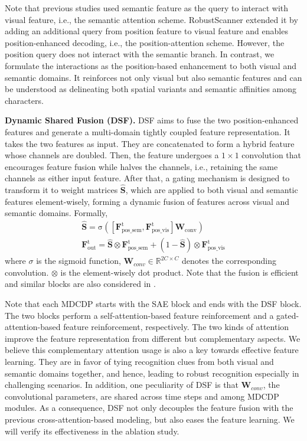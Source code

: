 Note that previous studies \citep{Baekwhats_wrong_19ICCV,li2019sar} used semantic feature as the query to interact with visual feature, i.e., the semantic attention scheme. RobustScanner \citep{yue2020robustscanner} extended it by adding an additional query from position feature to visual feature and enables position-enhanced decoding, i.e., the position-attention scheme. However, the position query does not interact with the semantic branch. In contrast, we formulate the interactions as the position-based enhancement to both visual and semantic domains. It reinforces not only visual but also semantic features and can be understood as delineating both spatial variants and semantic affinities among characters.

\noindent\textbf{Dynamic Shared Fusion (DSF).}
DSF aims to fuse the two position-enhanced features and generate a multi-domain tightly coupled feature representation. It takes the two features as input. They are concatenated to form a hybrid feature whose channels are doubled. Then, the feature undergoes a $1\times1$ convolution that encourages feature fusion while halves the channels, i.e., retaining the same channels as either input feature. After that, a gating mechanism is designed to transform it to weight matrices $\hat{\textbf{S}}$, which are applied to both visual and semantic features element-wisely, forming a dynamic fusion of features across visual and semantic domains. Formally,
\begin{gather}
\mathrm{\hat{\textbf{S}} = \sigma([\textbf{F}^t_{pos\_sem}, \textbf{F}^t_{pos\_vis}]\textbf{W}_{conv})}
\\
\mathrm{\textbf{F}^t_{out} =   \hat{\textbf{S}}\otimes \textbf{F}^t_{pos\_sem}+(1-\hat{\textbf{S}})\otimes \textbf{F}^t_{pos\_vis}}
\label{eq_sf}
\end{gather}
where $\sigma$ is the sigmoid function, $\textbf{W}_{conv}\in\mathbb{R}^{2C\times C}$ denotes the corresponding convolution. $\otimes$ is the element-wisely dot product. Note that the fusion is efficient and similar blocks are also considered in \citep{ABInet21CVPR,SRNyu2020towards}.


Note that each MDCDP starts with the SAE block and ends with the DSF block. The two blocks perform a self-attention-based feature reinforcement and a gated-attention-based feature reinforcement, respectively. The two kinds of attention improve the feature representation from different but complementary aspects. We believe this complementary attention usage is also a key towards effective feature learning. They are in favor of tying recognition clues from both visual and semantic domains together, and hence, leading to robust recognition especially in challenging scenarios. In addition, one peculiarity of DSF is that $\textbf{W}_{conv}$, the convolutional parameters, are shared across time steps and among MDCDP modules. As a consequence, DSF not only decouples the feature fusion with the previous cross-attention-based modeling, but also eases the feature learning. We will verify its effectiveness in the ablation study.

